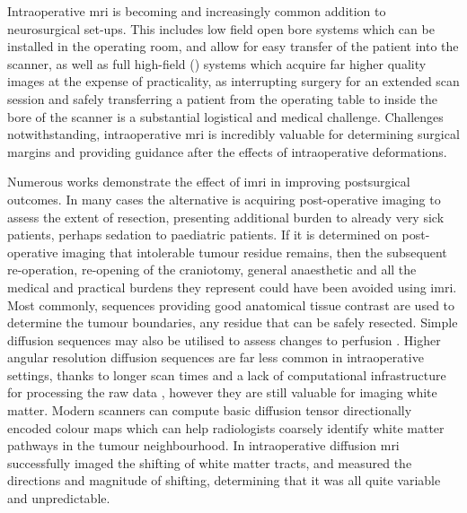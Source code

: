 Intraoperative \gls{mri} is becoming and increasingly common addition to neurosurgical set-ups.
This includes low field open bore systems which can be installed in the operating room, and allow for easy transfer of the patient into the scanner, as well as full high-field () systems which acquire far higher quality images at the expense of practicality, as interrupting surgery for an extended scan session and safely transferring a patient from the operating table to inside the bore of the scanner is a substantial logistical and medical challenge.
Challenges notwithstanding, intraoperative \gls{mri} is incredibly valuable for determining surgical margins and providing guidance after the effects of intraoperative deformations.

Numerous works demonstrate the effect of \gls{imri} in improving postsurgical outcomes.
In many cases the alternative is acquiring post-operative imaging to assess the extent of resection, presenting additional burden to already very sick patients, perhaps sedation to paediatric patients.
If it is determined on post-operative imaging that intolerable tumour residue remains, then the subsequent re-operation, re-opening of the craniotomy, general anaesthetic and all the medical and practical burdens they represent could have been avoided using \gls{imri}.
Most commonly, sequences providing good anatomical tissue contrast are used to determine the tumour boundaries, any residue that can be safely resected.
Simple diffusion sequences may also be utilised to assess changes to perfusion .
Higher angular resolution diffusion sequences are far less common in intraoperative settings, thanks to longer scan times and a lack of computational infrastructure for processing the raw data , however they are still valuable for imaging white matter.
Modern scanners can compute basic diffusion tensor directionally encoded colour maps which can help radiologists coarsely identify white matter pathways in the tumour neighbourhood.
In  intraoperative diffusion \gls{mri} successfully imaged the shifting of white matter tracts, and  measured the directions and magnitude of shifting, determining that it was all quite variable and unpredictable.
